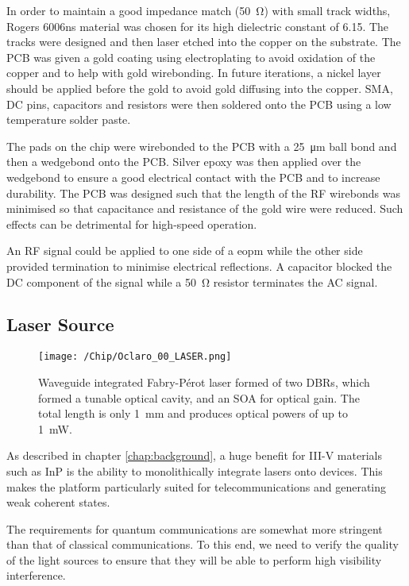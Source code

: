 In order to maintain a good impedance match (\SI{50}{\ohm}) with small track widths, Rogers 6006ns material was chosen for its high dielectric constant of \num{6.15}. The tracks were designed and then laser etched into the copper on the substrate. The PCB was given a gold coating using electroplating to avoid oxidation of the copper and to help with gold wirebonding. In future iterations, a nickel layer should be applied before the gold to avoid gold diffusing into the copper. SMA, DC pins, capacitors and resistors were then soldered onto the PCB using a low temperature solder paste.

The pads on the chip were wirebonded to the PCB with a \SI{25}{\micro\meter} ball bond and then a wedgebond onto the PCB. Silver epoxy was then applied over the wedgebond to ensure a good electrical contact with the PCB and to increase durability. The PCB was designed such that the length of the RF wirebonds was minimised so that capacitance and resistance of the gold wire were reduced. Such effects can be detrimental for high-speed operation.

An RF signal could be applied to one side of a \ac{eopm} while the other side provided termination to minimise electrical reflections. A capacitor blocked the DC component of the signal while a \SI{50}{\ohm} resistor terminates the AC signal. 

\subsection{Laser Source}

\begin{figure}[tp]
	\centering
	\texttt{[image: /Chip/Oclaro\_00\_LASER.png]}
	\caption[Microscope image of the waveguide integrated Fabry-P\'{e}rot laser]{Waveguide integrated Fabry-P\'{e}rot laser formed of two \acp{DBR}, which formed a tunable optical cavity, and an \ac{SOA} for optical gain. The total length is only \SI{1}{\mm} and produces optical powers of up to \SI{1}{\milli\watt}.}
	\label{fig:InP_laser}
\end{figure}

As described in chapter \ref{chap:background}, a huge benefit for III-V materials such as \ac{InP} is the ability to monolithically integrate lasers onto devices. This makes the platform particularly suited for telecommunications and generating weak coherent states. 

The requirements for quantum communications are somewhat more stringent than that of classical communications. To this end, we need to verify the quality of the light sources to ensure that they will be able to perform high visibility interference. 

